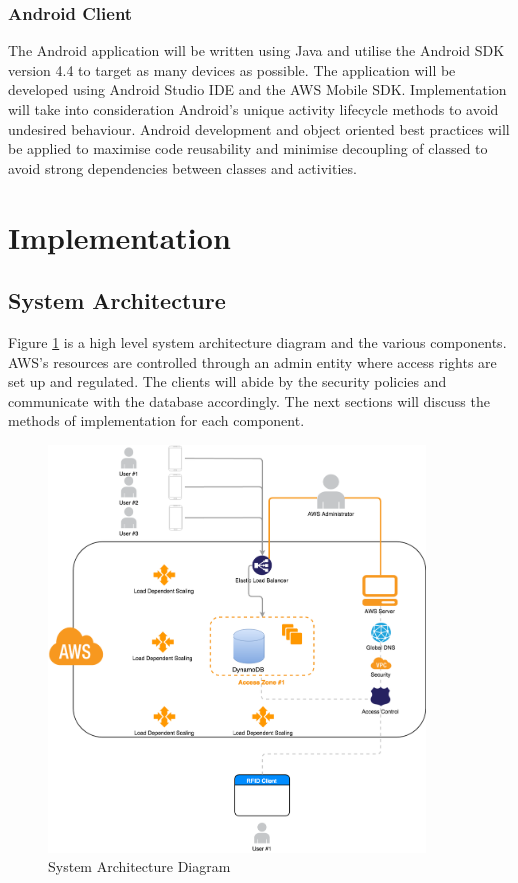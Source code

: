 \documentclass[a4paper, 11pt]{article}
\begin{document}
\subsubsection {Android Client}
The Android application will be written using Java and utilise the Android SDK version 4.4 to target as many devices as possible. The application will be developed using Android Studio IDE and the AWS Mobile SDK. Implementation will take into consideration Android's unique activity lifecycle methods to avoid undesired behaviour. Android development and object oriented best practices will be applied to maximise code reusability and minimise decoupling of classed to avoid strong dependencies between classes and activities.

\clearpage


\section{Implementation}

\subsection{System Architecture}
Figure \ref{fig:sysArch} is a high level system architecture diagram and the various components. AWS's resources are controlled through an admin entity where access rights are set up and regulated. The clients will abide by the security policies and communicate with the database accordingly. The next sections will discuss the methods of implementation for each component. 

\vspace{\baselineskip}

\begin{figure}[!htbp]
\centering
\includegraphics[width=10cm]{sysArch}
\caption{System Architecture Diagram} \label{fig:sysArch}
\end{figure}
\vspace{\baselineskip}
\vspace{\baselineskip}
\end{document}
